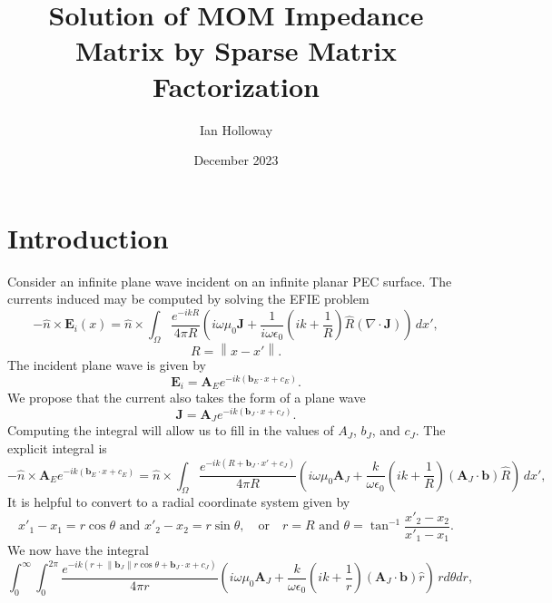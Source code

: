 \documentclass{article}
\title{Solution of MOM Impedance Matrix by Sparse Matrix Factorization}
\author{Ian Holloway}
\date{December 2023}
\newcommand{\norm}[1]{\left\lVert #1 \right\rVert}
\theoremstyle{plain}
\begin{document}
\maketitle

\section{Introduction}\label{sec_intro}

Consider an infinite plane wave incident on an infinite planar PEC surface.
The currents induced may be computed by solving the EFIE problem
\begin{equation}
	-\hat{n}\times\mathbf{E}_i(x) = \hat{n}\times\int_\Omega \frac{e^{-ikR}}{4\pi R}
	\left( i\omega\mu_0\mathbf{J} 
	+ \frac{1}{i\omega\epsilon_0}\left( ik + \frac{1}{R} \right) \hat{R} (\nabla\cdot\mathbf{J}) \right) \,dx',
\end{equation}
\begin{equation}
	R = \norm{x-x'}.
\end{equation}
The incident plane wave is given by
\begin{equation}
	\mathbf{E}_i = \mathbf{A}_Ee^{-ik(\mathbf{b}_E\cdot x + c_E)}.
\end{equation}
We propose that the current also takes the form of a plane wave
\begin{equation}
	\mathbf{J} = \mathbf{A}_Je^{-ik(\mathbf{b}_J\cdot x + c_J)}.
\end{equation}
Computing the integral will allow us to fill in the values of $A_J$, $b_J$, and $c_J$.
The explicit integral is
\begin{equation}
	-\hat{n}\times\mathbf{A}_Ee^{-ik(\mathbf{b}_E\cdot x + c_E)}
	= \hat{n}\times\int_\Omega \frac{e^{-ik(R+\mathbf{b}_J\cdot x' + c_J)}}{4\pi R}
	\left( i\omega\mu_0 \mathbf{A}_J
	+ \frac{k}{\omega\epsilon_0}\left( ik + \frac{1}{R} \right)(\mathbf{A}_J\cdot\mathbf{b}) \hat{R} \right) \,dx',
\end{equation}
It is helpful to convert to a radial coordinate system given by
\begin{equation}
	x'_1-x_1 = r\cos{\theta} \text{ and } x'_2-x_2 = r\sin{\theta}, \quad\text{or}\quad r = R \text{ and } \theta = \tan^{-1}{\frac{x'_2 - x_2}{x'_1 - x_1}}.
\end{equation}
We now have the integral
\begin{equation}
	\int_0^\infty \int_0^{2\pi} \frac{e^{-ik(r+\norm{\mathbf{b}_J}r\cos{\theta} + \mathbf{b}_J\cdot x + c_J)}}{4\pi r}
	\left( i\omega\mu_0 \mathbf{A}_J
	+ \frac{k}{\omega\epsilon_0}\left( ik + \frac{1}{r} \right)(\mathbf{A}_J\cdot\mathbf{b}) \hat{r} \right) \,rd\theta dr,
\end{equation}
\end{document}
